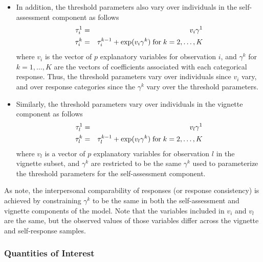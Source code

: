 \begin{itemize}
\begin{itemize}
\item In addition, the threshold parameters also vary over individuals
in the self-assessment component as follows
\begin{eqnarray*}
\tau_{i}^{1} &=& v_i \gamma^1 \\
\tau_{i}^{k} &=& \tau_{i}^{k-1} + \exp(v_i \gamma^k) \; {\rm for} \;
k = 2, \dots, K
\end{eqnarray*}
where $v_i$ is the vector of $p$ explanatory variables for observation
$i$, and $\gamma^k$ for $k = 1, \dots, K$ are the vectors of
coefficients associated with each categorical response.  Thus, the
threshold parameters vary over individuals since $v_i$ vary, and over
response categories since the $\gamma^k$ vary over the threshold
parameters.  

\item Similarly, the threshold parameters vary over individuals in the
vignette component as follows
\begin{eqnarray*}
\tau_{l}^{1} &=& v_l \gamma^1 \\
\tau_{l}^{k} &=& \tau_{l}^{k-1} + \exp(v_l \gamma^k) \; {\rm for} \;
k = 2, \dots, K
\end{eqnarray*}
where $v_l$ is a vector of $p$ explanatory variables for observation
$l$ in the vignette subset, and $\gamma^k$ are restricted to be the
same $\gamma^k$ used to parameterize the threshold parameters for the
self-assessment component.
\end{itemize}
As \cite{KinMurSal04} note, the interpersonal comparability of
responses (or response consistency) is achieved by constraining
$\gamma^k$ to be the same in both the self-assessment and vignette
components of the model.  Note that the variables included in $v_i$ and
$v_l$ are the same, but the observed values of those variables differ across
the vignette and self-response samples.
\end{itemize}


\subsubsection{Quantities of Interest}

